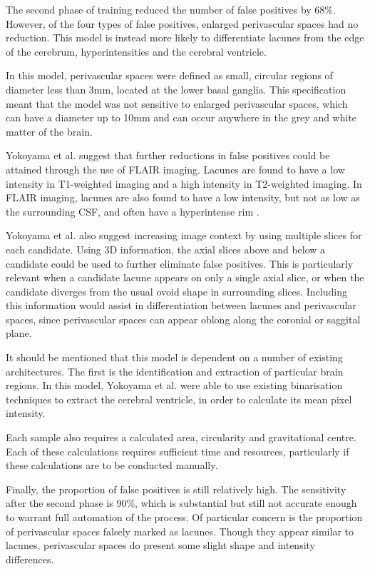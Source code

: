 \documentclass[honours,12pt]{unswthesis}
\numberwithin{equation}{section}
\begin{document}
The second phase of training reduced the number of false positives by 68\%. However, of the four types of false positives, enlarged perivascular spaces had no reduction. This model is instead more likely to differentiate lacunes from the edge of the cerebrum, hyperintensities and the cerebral ventricle.

In this model, perivascular spaces were defined as small, circular regions of diameter less than 3mm, located at the lower basal ganglia. This specification meant that the model was not sensitive to enlarged perivascular spaces, which can have a diameter up to 10mm and can occur anywhere in the grey and white matter of the brain.

Yokoyama et al. suggest that further reductions in false positives could be attained through the use of FLAIR imaging. Lacunes are found to have a low intensity in T1-weighted imaging and a high intensity in T2-weighted imaging. In FLAIR imaging, lacunes are also found to have a low intensity, but not as low as the surrounding CSF, and often have a hyperintense rim \cite{WardlawJ.M.2013Nsfr}. 

Yokoyama et al. also suggest increasing image context by using multiple slices for each candidate. Using 3D information, the axial slices above and below a candidate could be used to further eliminate false positives. This is particularly relevant when a candidate lacune appears on only a single axial slice, or when the candidate diverges from the usual ovoid shape in surrounding slices. Including this information would assist in differentiation between lacunes and perivascular spaces, since perivascular spaces can appear oblong along the coronial or saggital plane.

It should be mentioned that this model is dependent on a number of existing architectures. The first is the identification and extraction of particular brain regions. In this model, Yokoyama et al. were able to use existing binarisation techniques to extract the cerebral ventricle, in order to calculate its mean pixel intensity.

Each sample also requires a calculated area, circularity and gravitational centre. Each of these calculations requires sufficient time and resources, particularly if these calculations are to be conducted manually.


Finally, the proportion of false positives is still relatively high. The sensitivity after the second phase is 90\%, which is substantial but still not accurate enough to warrant full automation of the process. Of particular concern is the proportion of perivascular spaces falsely marked as lacunes. Though they appear similar to lacunes, perivascular spaces do present some slight shape and intensity differences.
\end{document}
